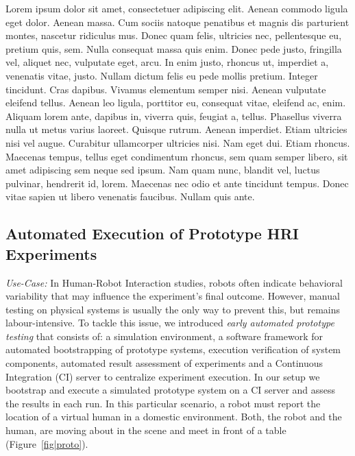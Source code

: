\documentclass[conference]{IEEEtran}
\begin{document}
Lorem ipsum dolor sit amet, consectetuer adipiscing elit. Aenean commodo ligula eget dolor. Aenean massa. Cum sociis natoque penatibus et magnis dis parturient montes, nascetur ridiculus mus. Donec quam felis, ultricies nec, pellentesque eu, pretium quis, sem. Nulla consequat massa quis enim. Donec pede justo, fringilla vel, aliquet nec, vulputate eget, arcu. In enim justo, rhoncus ut, imperdiet a, venenatis vitae, justo. Nullam dictum felis eu pede mollis pretium. Integer tincidunt. Cras dapibus. Vivamus elementum semper nisi. Aenean vulputate eleifend tellus. Aenean leo ligula, porttitor eu, consequat vitae, eleifend ac, enim. Aliquam lorem ante, dapibus in, viverra quis, feugiat a, tellus. Phasellus viverra nulla ut metus varius laoreet. Quisque rutrum. Aenean imperdiet. Etiam ultricies nisi vel augue. Curabitur ullamcorper ultricies nisi. Nam eget dui. Etiam rhoncus. Maecenas tempus, tellus eget condimentum rhoncus, sem quam semper libero, sit amet adipiscing sem neque sed ipsum. Nam quam nunc, blandit vel, luctus pulvinar, hendrerit id, lorem. Maecenas nec odio et ante tincidunt tempus. Donec vitae sapien ut libero venenatis faucibus. Nullam quis ante. 

\subsection{Automated Execution of Prototype HRI Experiments}
\label{scenario1}
\emph{Use-Case:} In Human-Robot Interaction studies, robots often indicate behavioral variability that may influence the experiment's final outcome. However, manual testing on physical systems is usually the only way to prevent this, but remains labour-intensive. To tackle this issue, we introduced \emph{early automated prototype testing} \cite{2645922} that consists of: a simulation environment, a software framework for automated bootstrapping of prototype systems, execution verification of system components, automated result assessment of experiments \cite{2563606} and a Continuous Integration (CI) \cite{duvall2007continuous} server to centralize experiment execution. In our setup we bootstrap and execute a simulated prototype system on a CI server and assess the results in each run. In this particular scenario, a robot must report the location of a virtual human in a domestic environment. Both, the robot and the human, are moving about in the scene and meet in front of a table (Figure~\ref{fig|proto}).
\end{document}
